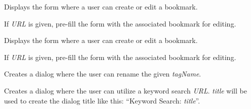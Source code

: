 \documentclass[letterpaper,10pt,openany]{sphinxmanual}
\begin{document}

\begin{fulllineitems}
\label{Applications/terminal/plugin_bookmarks:GateOne.Bookmarks.openImportDialog}
Displays the form where a user can create or edit a bookmark.

If \emph{URL} is given, pre-fill the form with the associated bookmark for editing.

\end{fulllineitems}


\begin{fulllineitems}
\label{Applications/terminal/plugin_bookmarks:GateOne.Bookmarks.openNewBookmarkForm}
Displays the form where a user can create or edit a bookmark.

If \emph{URL} is given, pre-fill the form with the associated bookmark for editing.

\end{fulllineitems}


\begin{fulllineitems}
\label{Applications/terminal/plugin_bookmarks:GateOne.Bookmarks.openRenameDialog}
Creates a dialog where the user can rename the given \emph{tagName}.

\end{fulllineitems}


\begin{fulllineitems}
\label{Applications/terminal/plugin_bookmarks:GateOne.Bookmarks.openSearchDialog}
Creates a dialog where the user can utilize a keyword search \emph{URL}.  \emph{title} will be used to create the dialog title like this:  ``Keyword Search: \emph{title}''.

\end{fulllineitems}
\end{document}
